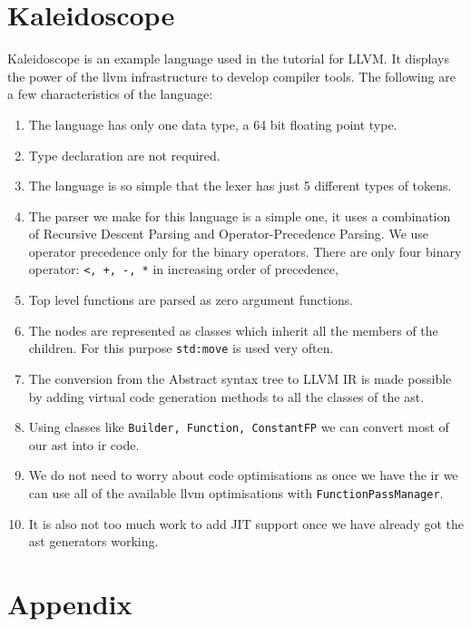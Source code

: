 \documentclass[12pt]{article}
\newcommand{\code}{\texttt}
\begin{document}
\section{Kaleidoscope}
Kaleidoscope is an example language used in the tutorial for LLVM. It displays the power of the llvm infrastructure to develop compiler tools. The following are a few characteristics of the language:
\begin{enumerate}
\item The language has only one data type, a 64 bit floating point type.
\item Type declaration are not required.
\item The language is so simple that the lexer has just 5 different types of tokens.
\item The parser we make for this language is a simple one, it uses a combination of Recursive Descent Parsing and Operator-Precedence Parsing. We use operator precedence only for the binary operators. There are only four binary operator: \code{<, +, -, *} in increasing order of precedence,
\item Top level functions are parsed as zero argument functions.
\item The nodes are represented as classes which inherit all the members of the children. For this purpose \code{std:move} is used very often.
\item The conversion from the Abstract syntax tree to LLVM IR is made possible by adding virtual code generation methods to all the classes of the ast.
\item Using classes like \code{Builder, Function, ConstantFP} we can convert most of our ast into ir code.
\item We do not need to worry about code optimisations as once we have the ir we can use all of the available llvm optimisations with  \code{FunctionPassManager}.
\item It is also not too much work to add JIT support once we have already got the ast generators working.

\end{enumerate}
\section{Appendix}
\end{document}
